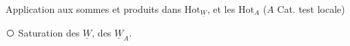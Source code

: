 Application aux sommes et produits dans $\mathrm{Hot}_{\underline W}$,
et les $\mathrm{Hot}_A$ ($A$ Cat. test locale)

\textcircled{}  Saturation  des $\underline W$, des $\underline W_A$.

\hrulefill

